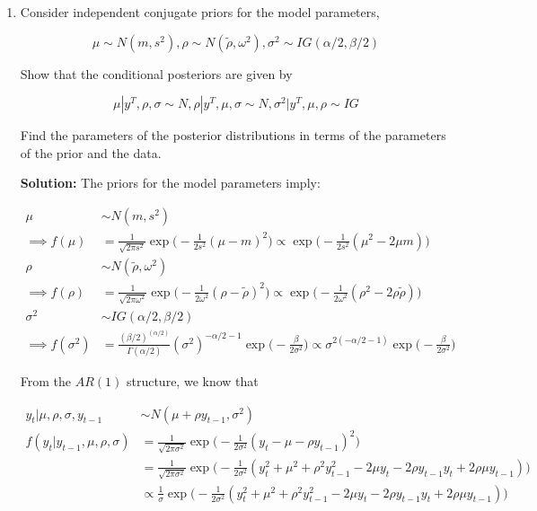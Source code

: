 \documentclass{article}
\begin{document}
\begin{enumerate}

\item Consider independent conjugate priors for the model parameters,

$$
\mu \sim N(m, s^2), \rho \sim N(\tilde\rho, \omega^2), \sigma^2 \sim IG(\alpha/2, \beta/2)
$$

Show that the conditional posteriors are given by

$$
\mu | y^T, \rho, \sigma \sim N, \rho | y^T, \mu, \sigma \sim N, \sigma^2 | y^T, \mu, \rho \sim IG
$$

Find the parameters of the posterior distributions in terms of the parameters of the prior and
the data.

\textbf{Solution:} The priors for the model parameters imply:

\begin{align*}
\mu &\sim N(m, s^2)\\
\implies f(\mu) 
&= \frac{1}{\sqrt{2\pi s^2}} \exp \Bigg( - \frac{1}{2s^2} (\mu - m)^2\Bigg) 
\propto \exp \Bigg( - \frac{1}{2s^2} (\mu^2 - 2\mu m) \Bigg) \\
\rho &\sim N(\tilde\rho, \omega^2) \\
\implies f(\rho) 
&= \frac{1}{\sqrt{2\pi \omega^2}} \exp \Bigg( - \frac{1}{2 \omega^2} (\rho - \tilde\rho)^2\Bigg) 
\propto \exp \Bigg( - \frac{1}{2\omega^2} (\rho^2 - 2\rho \tilde \rho) \Bigg) \\ 
\sigma^2 &\sim IG(\alpha/2, \beta/2) \\
\implies f(\sigma^2)
&= \frac{(\beta/2)^{(\alpha/2)}}{\Gamma(\alpha/2)} (\sigma^2)^{-\alpha/2 - 1} \exp\Bigg( - \frac{\beta}{2\sigma^2} \Bigg)  
\propto \sigma^{2(-\alpha/2 - 1)} \exp \Bigg( - \frac{\beta}{2\sigma^2}\Bigg)
\end{align*}

From the $AR(1)$ structure, we know that 

\begin{align*}
y_{t} | \mu, \rho, \sigma, y_{t-1} &\sim N(\mu + \rho y_{t-1}, \sigma^2) \\ 
f(y_t|y_{t-1}, \mu, \rho, \sigma) &= \frac{1}{\sqrt{2\pi \sigma^2}} \exp \Bigg( - \frac{1}{2 \sigma^2} (y_t - \mu - \rho y_{t-1})^2\Bigg) \\
&= \frac{1}{\sqrt{2\pi \sigma^2}} \exp \Bigg( - \frac{1}{2 \sigma^2} (y_t^2 + \mu^2 + \rho^2 y_{t-1}^2 - 2\mu y_t - 2 \rho y_{t-1}y_t + 2\rho \mu y_{t-1})\Bigg) \\
&\propto \frac{1}{\sigma}\exp \Bigg( - \frac{1}{2 \sigma^2} (y_t^2 + \mu^2 + \rho^2 y_{t-1}^2 - 2\mu y_t - 2 \rho y_{t-1}y_t + 2\rho \mu y_{t-1})\Bigg)
\end{align*}


\end{enumerate}
\end{document}
